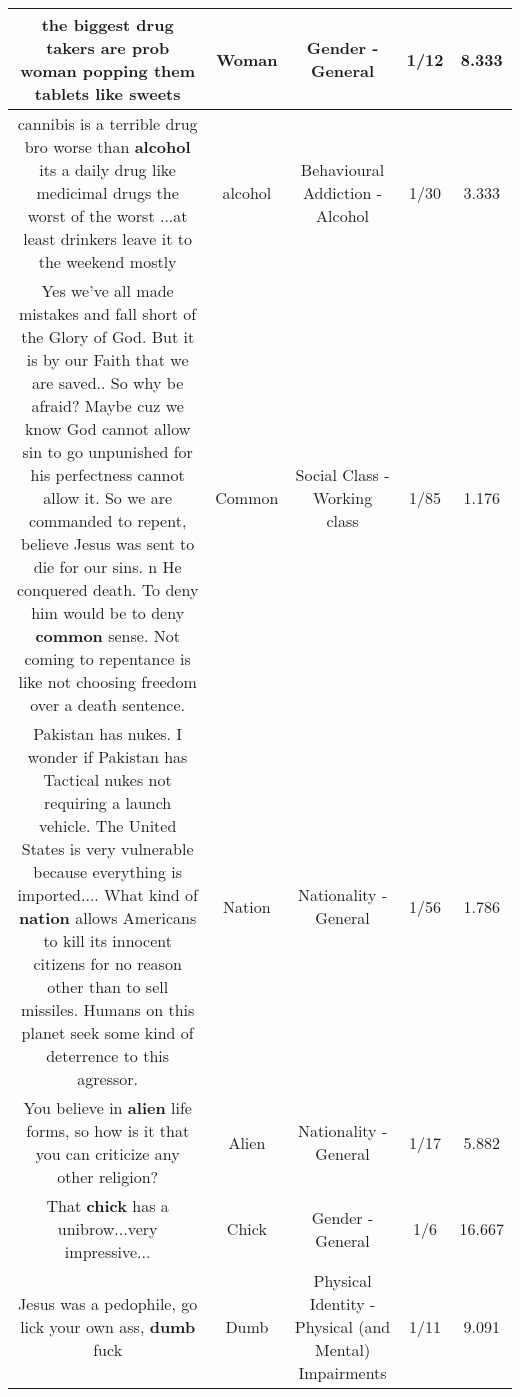 \documentclass[11pt]{article}
\newlength\mylength
\begin{document}
\begin{center}
\begin{longtable}{|C{.65\mylength}|C{.30\mylength}|C{.12\mylength}|C{.12\mylength}|C{.12\mylength}|}
  \small the biggest drug takers are prob \textbf{woman} popping them tablets like sweets\normalsize   & Woman & Gender - General & 1/12 & 8.333 \\  \hline
  \small cannibis is a terrible drug bro worse than \textbf{alcohol} its a daily drug like medicimal drugs the worst of the worst ...at least drinkers leave it to the weekend mostly\normalsize   & alcohol & Behavioural Addiction - Alcohol & 1/30 & 3.333 \\  \hline
  \small Yes we've all made mistakes and fall short of the Glory of God. But it is by our Faith that we are saved.. So why be afraid? Maybe cuz we know God cannot allow sin to go unpunished for his perfectness cannot allow it. So we are commanded to repent, believe Jesus was sent to die for our sins. n He conquered death. To deny him would be to deny \textbf{common} sense. Not coming to repentance is like not choosing freedom over a death sentence.\normalsize   & Common & Social Class - Working class & 1/85 & 1.176 \\  \hline
  \small Pakistan has nukes. I wonder if Pakistan has Tactical nukes not requiring a launch vehicle. The United States is very vulnerable because everything is imported.... What kind of \textbf{nation} allows Americans to kill its innocent citizens for no reason other than to sell missiles. Humans on this planet seek some kind of deterrence to this agressor.\normalsize   & Nation & Nationality - General & 1/56 & 1.786 \\  \hline
  \small You believe in \textbf{alien} life forms, so how is it that you can criticize any other religion?\normalsize   & Alien & Nationality - General & 1/17 & 5.882 \\  \hline
  \small That \textbf{chick} has a unibrow...very impressive...\normalsize   & Chick & Gender - General & 1/6 & 16.667 \\  \hline
  \small Jesus was a pedophile, go lick your own ass, \textbf{dumb} fuck\normalsize   & Dumb & Physical Identity - Physical (and Mental) Impairments & 1/11 & 9.091 \\  \hline

\end{longtable}
\end{center}
\end{document}
